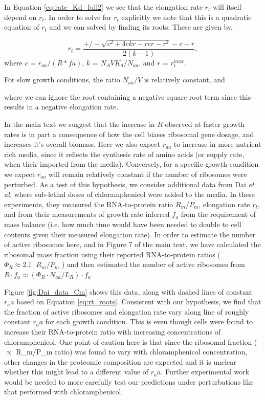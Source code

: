 In Equation \ref{eq:rate_Kd_full2} we see that the elongation rate $r_t$ will
itself depend on $r_t$. In order to solve for $r_t$ explicitly we note that this
is a quadratic equation of $r_t$ and we can solved by finding its roots. These
are given by,

\begin{equation}
r_t = \frac{+/- \sqrt{c^2 + 4 c k r - r cr - r^2} - c - r}{2 (k - 1)},
\label{eq:rt_roots}
\end{equation}
where $c$ = $r_{aa}/ (R*fa)$, $k$ = $N_A V K_d/N_{aa}$, and $r$ = $r_t^{max}$.

For slow growth conditions, the ratio
$N_{aa}/V$ is relatively constant, and


where we can ignore the root containing a negative square root term since this
results in a negative elongation rate.

In the main text we suggest that the increase in $R$ observed at faster growth
rates is in part a consequence of how the cell biases ribosomal gene dosage, and
increases it's overall biomass. Here we also expect $r_{aa}$ to increase in more
nutrient rich media, since it reflects the synthesis rate of amino acids (or
supply rate, when their imported from the media). Conversely, for a specific
growth condition we expect $r_{aa}$ will remain relatively constant if the
number of ribosomes were perturbed. As a test of this hypothesis, we consider
additional data from Dai \textit{et al.} where sub-lethal doses of
chloramphenicol were added to the media. In these experiments,  they measured
the RNA-to-protein ratio $R_m/P_m$, elongation rate $r_t$, and from their
measurements of growth rate inferred $f_a$ from the requirement of mass balance
(i.e. how  much time would have been needed to double to cell contents given
their measured elongation rate). In order to estimate the number of active
ribosomes here, and in Figure 7 of the main text, we have calculated the
ribosomal mass fraction using their reported RNA-to-protein ratios ($\Phi_R
\approx 2.1 \cdot R_m/P_m$ \cite{dai2016}) and then estimated the number of
active ribosomes from $R \cdot f_a \approx (\Phi_R \cdot N_{aa}/ L_R) \cdot
f_a$.



Figure \ref{fig:Dai_data_Cm} shows this data, along with dashed lines of
constant $r_aa$ based on Equation \ref{eq:rt_roots}. Consistent with our
hypothesis, we find that the fraction of active ribosomes and elongation rate
vary along line of roughly constant $r_aa$ for each growth condition. This is
even though cells were found to increase their RNA-to-protein ratio with
increasing concentrations of chloramphenicol. One point of caution here is that
since the ribosomal fraction ($\propto$ R_m/P_m ratio) was found to vary with
chloramphenicol concentration, other changes in the proteomic composition are
expected and it is unclear whether this might lead to a different value of
$r_aa$. Further experimental work would be needed to more carefully test our
predictions under perturbations like that performed with chloramphenicol.


